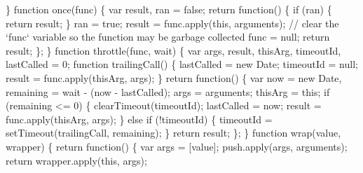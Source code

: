 \begin{DoxyCodeInclude}
{{\textcolor{stringliteral}{  \}}
\textcolor{stringliteral}{}
\textcolor{stringliteral}{  function once(func) \{}
\textcolor{stringliteral}{    var result,}
\textcolor{stringliteral}{        ran = false;}
\textcolor{stringliteral}{}
\textcolor{stringliteral}{    return function() \{}
\textcolor{stringliteral}{      if (ran) \{}
\textcolor{stringliteral}{        return result;}
\textcolor{stringliteral}{      \}}
\textcolor{stringliteral}{      ran = true;}
\textcolor{stringliteral}{      result = func.apply(this, arguments);}
\textcolor{stringliteral}{}
\textcolor{stringliteral}{      // clear the `func` variable so the function may be garbage collected}
\textcolor{stringliteral}{      func = null;}
\textcolor{stringliteral}{      return result;}
\textcolor{stringliteral}{    \};}
\textcolor{stringliteral}{  \}}
\textcolor{stringliteral}{}
\textcolor{stringliteral}{  function throttle(func, wait) \{}
\textcolor{stringliteral}{    var args,}
\textcolor{stringliteral}{        result,}
\textcolor{stringliteral}{        thisArg,}
\textcolor{stringliteral}{        timeoutId,}
\textcolor{stringliteral}{        lastCalled = 0;}
\textcolor{stringliteral}{}
\textcolor{stringliteral}{    function trailingCall() \{}
\textcolor{stringliteral}{      lastCalled = new Date;}
\textcolor{stringliteral}{      timeoutId = null;}
\textcolor{stringliteral}{      result = func.apply(thisArg, args);}
\textcolor{stringliteral}{    \}}
\textcolor{stringliteral}{    return function() \{}
\textcolor{stringliteral}{      var now = new Date,}
\textcolor{stringliteral}{          remaining = wait - (now - lastCalled);}
\textcolor{stringliteral}{}
\textcolor{stringliteral}{      args = arguments;}
\textcolor{stringliteral}{      thisArg = this;}
\textcolor{stringliteral}{}
\textcolor{stringliteral}{      if (remaining <= 0) \{}
\textcolor{stringliteral}{        clearTimeout(timeoutId);}
\textcolor{stringliteral}{        lastCalled = now;}
\textcolor{stringliteral}{        result = func.apply(thisArg, args);}
\textcolor{stringliteral}{      \}}
\textcolor{stringliteral}{      else if (!timeoutId) \{}
\textcolor{stringliteral}{        timeoutId = setTimeout(trailingCall, remaining);}
\textcolor{stringliteral}{      \}}
\textcolor{stringliteral}{      return result;}
\textcolor{stringliteral}{    \};}
\textcolor{stringliteral}{  \}}
\textcolor{stringliteral}{}
\textcolor{stringliteral}{  function wrap(value, wrapper) \{}
\textcolor{stringliteral}{    return function() \{}
\textcolor{stringliteral}{      var args = [value];}
\textcolor{stringliteral}{      push.apply(args, arguments);}
\textcolor{stringliteral}{      return wrapper.apply(this, args);}
}}
\end{DoxyCodeInclude}
